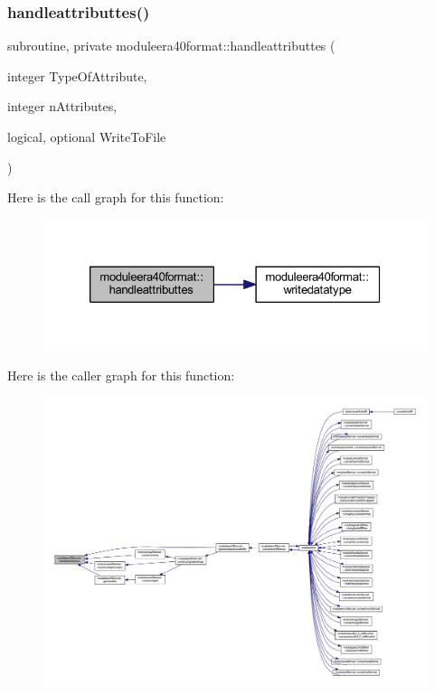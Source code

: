 \subsubsection{\texorpdfstring{handleattributtes()}{handleattributtes()}}
{\footnotesize\ttfamily subroutine, private moduleera40format\+::handleattributtes (\begin{DoxyParamCaption}\item[{integer}]{Type\+Of\+Attribute,  }\item[{integer}]{n\+Attributes,  }\item[{logical, optional}]{Write\+To\+File }\end{DoxyParamCaption})\hspace{0.3cm}{\ttfamily [private]}}

Here is the call graph for this function\+:\nopagebreak
\begin{figure}[H]
\begin{center}
\leavevmode
\includegraphics[width=326pt]{namespacemoduleera40format_adaf25cab272ca9c6e2db6b1f641c0136_cgraph}
\end{center}
\end{figure}
Here is the caller graph for this function\+:\nopagebreak
\begin{figure}[H]
\begin{center}
\leavevmode
\includegraphics[width=350pt]{namespacemoduleera40format_adaf25cab272ca9c6e2db6b1f641c0136_icgraph}
\end{center}
\end{figure}
\mbox{\label{namespacemoduleera40format_a496e3a66acda20102bdeaa457f8faf96}} 
